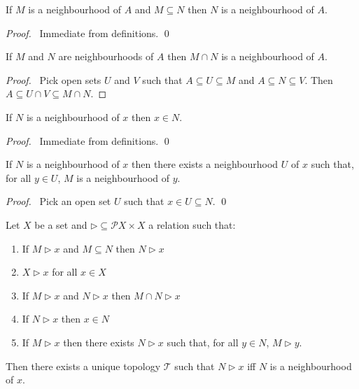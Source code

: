 \begin{prop}
  \label{prop:topology:neighbourhood:monotone}
  If $M$ is a neighbourhood of $A$ and $M \subseteq N$ then $N$ is a
  neighbourhood of $A$.
\end{prop}

\begin{proof}
  \pf\ Immediate from definitions. \qed
\end{proof}

\begin{prop}
  \label{prop:topology:neighbourhood:intersection}
  If $M$ and $N$ are neighbourhoods of $A$ then $M \cap N$ is a neighbourhood
  of $A$.
\end{prop}

\begin{proof}
  \pf\ Pick open sets $U$ and $V$ such that $A \subseteq U \subseteq M$
  and $A \subseteq N \subseteq V$. Then $A \subseteq U \cap V \subseteq M
  \cap N$.
\end{proof}

\begin{prop}
  If $N$ is a neighbourhood of $x$ then $x \in N$.
\end{prop}

\begin{proof}
  \pf\ Immediate from definitions. \qed
\end{proof}

\begin{prop}
  If $N$ is a neighbourhood of $x$ then there exists a neighbourhood $U$ of
  $x$ such that, for all $y \in U$, $M$ is a neighbourhood of $y$.
\end{prop}

\begin{proof}
  \pf\ Pick an open set $U$ such that $x \in U \subseteq N$. \qed
\end{proof}

\begin{thm}
  Let $X$ be a set and $\rhd \subseteq \mathcal{P} X \times X$ a relation
  such that:
  \begin{enumerate}
    \item If $M \rhd x$ and $M \subseteq N$ then $N \rhd x$
    \item $X \rhd x$ for all $x \in X$
    \item If $M \rhd x$ and $N \rhd x$ then $M \cap N \rhd x$
    \item If $N \rhd x$ then $x \in N$
    \item If $M \rhd x$ then there exists $N \rhd x$ such that, for all $y
    \in N$, $M \rhd y$.
  \end{enumerate}
  Then there exists a unique topology $\mathcal{T}$ such that $N \rhd x$ iff
  $N$ is a neighbourhood of $x$.
\end{thm}

